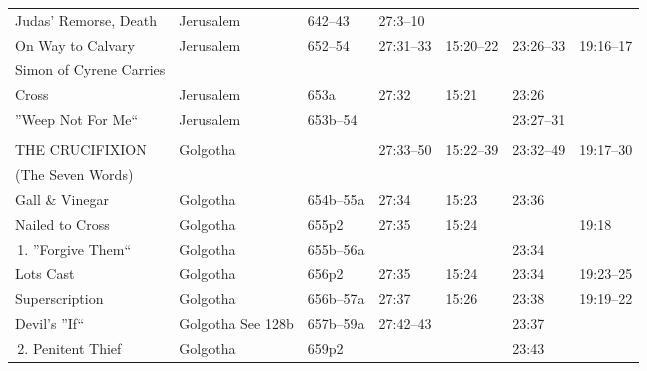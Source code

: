 \begin{longtable}[h]{l@{\hspace{0.5em}}l@{\hspace{0.5em}}l@{\hspace{0.5em}}BBBB}
\quad Judas' Remorse, Death                & Jerusalem           & 642--43            & 27:3--10          &                    &                       & \\
\quad On Way to Calvary                    & Jerusalem           & 652--54            & 27:31--33         & 15:20--22          & 23:26--33             & 19:16--17 \\
\quad Simon of Cyrene Carries\\
\qquad Cross                               & Jerusalem           & 653a               & 27:32             & 15:21              & 23:26                 & \\
\quad ''Weep Not For Me``                  & Jerusalem           & 653b--54           &                   &                    & 23:27--31             & \\
\\
THE CRUCIFIXION                            & Golgotha            &                    & 27:33--50         & 15:22--39          & 23:32--49             & 19:17--30 \\
\quad (The Seven Words)                    &                     &                    &                   &                    &                       & \\
\quad Gall \& Vinegar                      & Golgotha            & 654b--55a          & 27:34             & 15:23              & 23:36                 & \\
\quad Nailed to Cross                      & Golgotha            & 655p2              & 27:35             & 15:24              &                       & 19:18 \\
\,1. ''Forgive Them``                      & Golgotha            & 655b--56a          &                   &                    & 23:34                 & \\
\quad Lots Cast                            & Golgotha            & 656p2              & 27:35             & 15:24              & 23:34                 & 19:23--25 \\
\quad Superscription                       & Golgotha            & 656b--57a          & 27:37             & 15:26              & 23:38                 & 19:19--22 \\
\quad Devil's ''If``                       & Golgotha See 128b   & 657b--59a          & 27:42--43         &                    & 23:37                 & \\
\,2. Penitent Thief                        & Golgotha            & 659p2              &                   &                    & 23:43                 & \\

\end{longtable}
